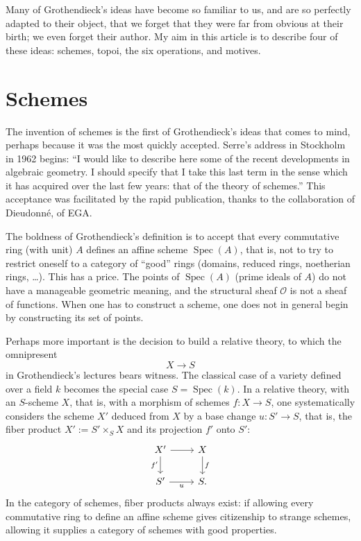 \documentclass[11pt]{article}
\begin{document}
Many of Grothendieck's ideas have become so familiar to us, and are so perfectly adapted to their object, that we forget that they were far from obvious at their birth; we even forget their author. My aim in this article is to describe four of these ideas: schemes, topoi, the six operations, and motives.

\section{Schemes}

The invention of schemes is the first of Grothendieck's ideas that comes to mind, perhaps because it was the most quickly accepted. Serre's address in Stockholm in 1962 begins: ``I would like to describe here some of the recent developments in algebraic geometry. I should specify that I take this last term in the sense which it has acquired over the last few years: that of the theory of schemes.'' This acceptance was facilitated by the rapid publication, thanks to the collaboration of Dieudonné, of EGA.

The boldness of Grothendieck's definition is to accept that every commutative ring (with unit) \(A\) defines an affine scheme \(\operatorname{Spec}(A)\), that is, not to try to restrict oneself to a category of ``good'' rings (domains, reduced rings, noetherian rings, \ldots). This has a price. The points of \(\operatorname{Spec}(A)\) (prime ideals of \(A\)) do not have a manageable geometric meaning, and the structural sheaf \(\mathcal O\) is not a sheaf of functions. When one has to construct a scheme, one does not in general begin by constructing its set of points.

Perhaps more important is the decision to build a relative theory, to which the omnipresent
\[
  X \longrightarrow S
\]
in Grothendieck's lectures bears witness. The classical case of a variety defined over a field \(k\) becomes the special case \(S=\operatorname{Spec}(k)\). In a relative theory, with an \(S\)-scheme \(X\), that is, with a morphism of schemes \(f:X\to S\), one systematically considers the scheme \(X'\) deduced from \(X\) by a base change \(u:S'\to S\), that is, the fiber product \(X':=S'\times_S X\) and its projection \(f'\) onto \(S'\):
\[
\begin{tikzcd}
X' \arrow[r] \arrow[d,"f'"'] & X \arrow[d,"f"]\\
S' \arrow[r,"u"'] & S .
\end{tikzcd}
\]
In the category of schemes, fiber products always exist: if allowing every commutative ring to define an affine scheme gives citizenship to strange schemes, allowing it supplies a category of schemes with good properties.
\end{document}
